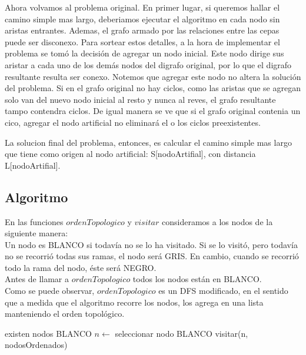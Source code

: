 Ahora volvamos al problema original. En primer lugar, si queremos hallar el camino simple mas largo, deberiamos ejecutar el algoritmo en cada nodo sin aristas entrantes. Ademas, el grafo armado por las relaciones entre las cepas puede ser disconexo. 
Para sortear estos detalles, a la hora de implementar el problema se tomó la decisión de agregar un nodo inicial. Este nodo dirige sus aristar a cada uno de los demás nodos del digrafo original, por lo que el digrafo resultante resulta ser conexo. Notemos que agregar este nodo no altera la solución del problema. Si en el grafo original no hay ciclos, como las aristas que se agregan solo van del nuevo nodo inicial al resto y nunca al reves, el grafo resultante tampo contendra ciclos. De igual manera se ve que si el grafo original contenia un cico, agregar el nodo artificial no eliminar\'a el o los ciclos preexistentes. 

La solucion final del problema, entonces, es calcular el camino simple mas largo que tiene como origen al nodo artificial: S[nodoArtifial], con distancia L[nodoArtifial].



\subsection{Algoritmo}

\indent En las funciones $ordenTopologico$ y $visitar$ consideramos a los nodos de la siguiente manera:\\
\indent Un nodo es BLANCO si todavía no se lo ha visitado. Si se lo visitó, pero todavía no se recorrió todas sus ramas, el nodo será GRIS. En cambio, cuando se recorrió todo la rama del nodo, éste será NEGRO.\\
\indent Antes de llamar a $ordenTopologico$ todos los nodos están en BLANCO. \\
\indent Como se puede observar, $ordenTopologico$ es un DFS modificado, en el sentido que a medida que el algoritmo recorre los nodos, los agrega en una lista manteniendo el orden topológico.\\


\begin{algorithm}[H]
\caption{} 
\begin{codebox}
\li \While existen nodos BLANCO \Do
\li	$n \gets$ seleccionar nodo BLANCO
\li	visitar(n, nodosOrdenados)

\End
\end{codebox}
\end{algorithm}


